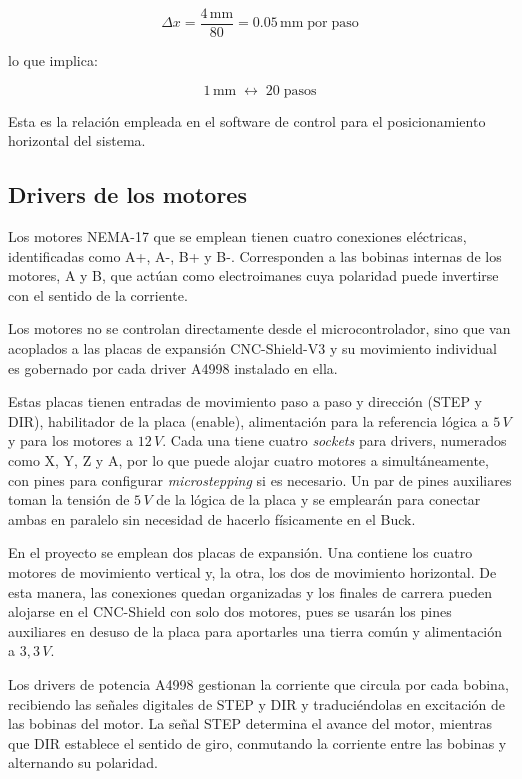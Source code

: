 \begin{equation}
	\Delta x = \frac{4\,\mathrm{mm}}{80} = 0.05\,\mathrm{mm \; por \; paso}
\end{equation}

lo que implica:

\begin{equation}
	1\,\mathrm{mm} \;\longleftrightarrow\; 20 \;\text{pasos}
\end{equation}

Esta es la relación empleada en el software de control para el posicionamiento horizontal del sistema.


\subsection{Drivers de los motores}

Los motores NEMA-17 que se emplean tienen cuatro conexiones eléctricas, identificadas como A+, A-, B+ y B-. Corresponden a las bobinas internas de los motores, A y B, que actúan como electroimanes cuya polaridad puede invertirse con el sentido de la corriente. 

Los motores no se controlan directamente desde el microcontrolador, sino que van acoplados a las placas de expansión CNC-Shield-V3 y su movimiento individual es gobernado por cada driver A4998 instalado en ella. 

Estas placas tienen entradas de movimiento paso a paso y dirección (STEP y DIR), habilitador de la placa (enable), alimentación para la referencia lógica a $5\, V$ y para los motores a $12\, V$. Cada una tiene cuatro \textit{sockets} para drivers, numerados como X, Y, Z y A, por lo que puede alojar cuatro motores a simultáneamente, con pines para configurar \textit{microstepping} si es necesario. Un par de pines auxiliares toman la tensión de $5 \, V$ de la lógica de la placa y se emplearán para conectar ambas en paralelo sin necesidad de hacerlo físicamente en el Buck. 

En el proyecto se emplean dos placas de expansión. Una contiene los cuatro motores de movimiento vertical y, la otra, los dos de movimiento horizontal. De esta manera, las conexiones quedan organizadas y los finales de carrera pueden alojarse en el CNC-Shield con solo dos motores, pues se usarán los pines auxiliares en desuso de la placa para aportarles una tierra común y alimentación a $3,3\, V$. 

Los drivers de potencia A4998 gestionan la corriente que circula por cada bobina, recibiendo las señales digitales de STEP y DIR y traduciéndolas en excitación de las bobinas del motor. La señal STEP determina el avance del motor, mientras que DIR establece el sentido de giro, conmutando la corriente entre las bobinas y alternando su polaridad.

